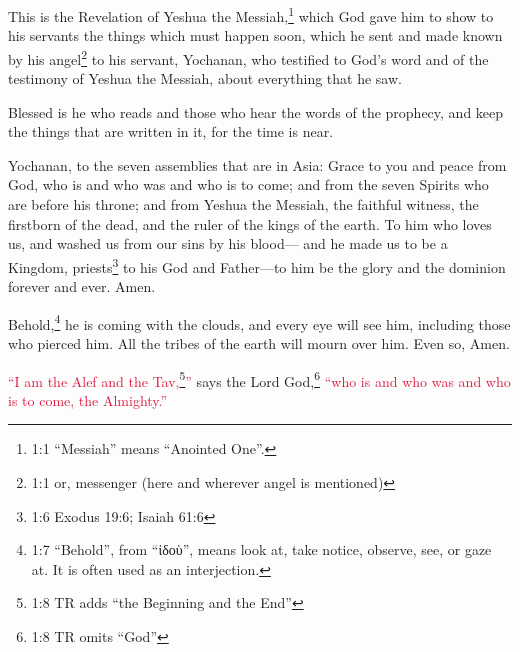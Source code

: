 \newpage
\null
\thispagestyle{empty}
\newpage






\vspace{-1.36in}


\mychapter{} \myverse*{}This is the Revelation of Yeshua the Messiah,\footnote{1:1 “Messiah” means “Anointed One”.} which God gave him to show to his servants the things
which must happen soon, which he sent and made known by his angel\footnote{1:1 or, messenger (here and wherever angel is mentioned)} to his servant, Yochanan,
\myverse{}who testified to God’s word and of the testimony of Yeshua the Messiah, about
everything that he saw.

\myverse{}Blessed is he who reads and those who hear the words of the prophecy,
and keep the things that are written in it, for the time is near.

\myverse{}Yochanan, to the seven assemblies that are in Asia: Grace to you
and peace from God, who is and who was and who is to come; and from the seven Spirits who are before his
throne;
\myverse{}and from Yeshua the Messiah, the faithful witness, the firstborn of the dead,
and the ruler of the kings of the earth. To him who loves us, and washed us from our sins by his blood—
\myverse{}and he made us to be a Kingdom, priests\footnote{1:6 Exodus 19:6;
	Isaiah 61:6} to his God and Father—to him be the glory and the dominion forever and ever. Amen.

\myverse{}Behold,\footnote{1:7 “Behold”, from “ἰδοὺ”, means look at, take notice, observe, see, or gaze at. It is often used
	as an interjection.} he is coming with the clouds, and every eye will see him, including those
who pierced him. All the tribes of the earth will mourn over him. Even so, Amen.

\myverse{}\textcolor{crimson}{“I am the Alef and the Tav,}\footnote{1:8 TR adds “the Beginning and the End”}\textcolor{crimson}{”} says the Lord God,\footnote{1:8 TR omits “God”}
\textcolor{crimson}{“who is and who was and who is to come, the Almighty.”}

